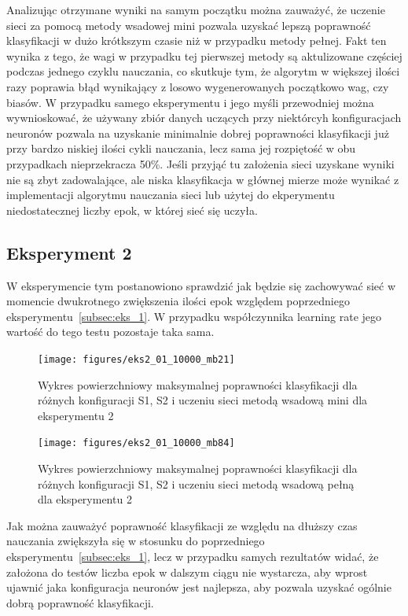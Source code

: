 \documentclass[12pt,twoside]{article}
\begin{document}
Analizując otrzymane wyniki na samym początku można zauważyć, że uczenie sieci za pomocą metody wsadowej mini pozwala uzyskać lepszą poprawność klasyfikacji w dużo krótkszym czasie niż w przypadku metody pełnej.
Fakt ten wynika z tego, że wagi w przypadku tej pierwszej metody są aktulizowane częściej podczas jednego czyklu nauczania, co skutkuje tym, że algorytm w większej ilości razy poprawia błąd wynikający z losowo wygenerowanych początkowo wag, czy biasów.
W przypadku samego eksperymentu i jego myśli przewodniej można wywnioskować, że używany zbiór danych uczących przy niektórcyh konfiguracjach neuronów pozwala na uzyskanie minimalnie dobrej poprawności klasyfikacji już przy bardzo niskiej ilości cykli nauczania, lecz sama jej rozpiętość w obu przypadkach nieprzekracza 50\%. Jeśli przyjąć tu założenia sieci uzyskane wyniki nie są zbyt zadowalające, ale niska klasyfikacja w głównej mierze może wynikać z implementacji algorytmu nauczania sieci lub użytej do ekperymentu niedostatecznej liczby epok, w której sieć się uczyła.

\newpage
\subsection{Eksperyment 2} \label{subsec:eks_2}
W eksperymencie tym postanowiono sprawdzić jak będzie się zachowywać sieć w momencie dwukrotnego zwiększenia ilości epok względem poprzedniego eksperymentu~\ref{subsec:eks_1}. W przypadku współczynnika learning rate jego wartość do tego testu pozostaje taka sama.
\begin{figure}[ht!]
	\centering
	\texttt{[image: figures/eks2\_01\_10000\_mb21]}
	\caption{Wykres powierzchniowy maksymalnej poprawności klasyfikacji dla różnych konfiguracji S1, S2 i uczeniu sieci metodą wsadową mini dla eksperymentu 2}
	\label{Fig:eks2_01_10000_mb21}
\end{figure}
\begin{figure}[ht!]
	\centering
	\texttt{[image: figures/eks2\_01\_10000\_mb84]}
	\caption{Wykres powierzchniowy maksymalnej poprawności klasyfikacji dla różnych konfiguracji S1, S2 i uczeniu sieci metodą wsadową pełną dla eksperymentu 2}
	\label{Fig:eks2_01_10000_mb84}
\end{figure}

Jak można zauważyć poprawność klasyfikacji ze względu na dłuższy czas nauczania zwiększyła się w stosunku do poprzedniego eksperymentu~\ref{subsec:eks_1}, lecz w przypadku samych rezultatów widać, że założona do testów liczba epok w dalszym ciągu nie wystarcza, aby wprost ujawnić jaka konfiguracja neuronów jest najlepsza, aby pozwala uzyskać ogólnie dobrą poprawność klasyfikacji.
\newpage
\end{document}
